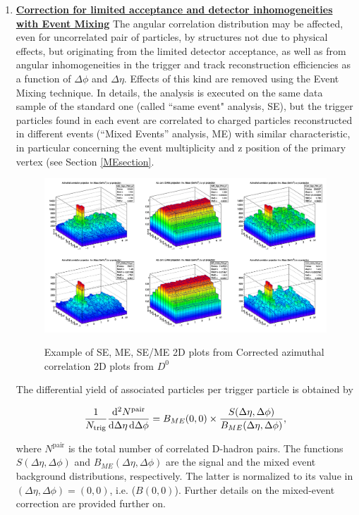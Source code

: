 \begin{enumerate}
\item
\underline {\bf Correction for limited acceptance and detector inhomogeneities with Event Mixing}
The angular correlation distribution may be affected, even for uncorrelated pair of particles, by structures not due to physical effects, but originating from the limited detector acceptance, as well as from angular inhomogeneities in the trigger and track reconstruction efficiencies as a function of $\Delta\phi$ and $\Delta\eta$.
Effects of this kind are removed using the Event Mixing technique.
In details, the analysis is executed on the same data sample of the standard one (called ``same event" analysis, SE), but the trigger particles found in each event are correlated to charged particles reconstructed in different events (``Mixed Events'' analysis, ME) with similar characteristic, in particular concerning the event multiplicity and z position of the primary vertex (see Section \ref{MEsection}. \\

\begin{figure}
\centering
{\includegraphics[width=.30\linewidth]{figures/Dzero/CorrSEandME_Dzero_Canvas_PtIntBins9to11_pool7_thr0.3to99.0.png}}

 \caption{Example of SE, ME, SE/ME 2D plots from Corrected azimuthal correlation 2D plots from ${D}^0$} 
\label{fig:DzeroME}
\end{figure}

The differential yield of associated particles per trigger particle is obtained by
\begin{linenomath}
  \begin{equation}
    \label{2pcorr_incl}
    \frac{1}{N_\text{trig}}\frac{\mathrm{d}^{2}N^\text{pair}}{\mathrm{d}\Delta\eta\, \mathrm{d}\Delta\phi}
= B_{ME}(0,0)\times\frac{S(\Delta\eta,\Delta\phi)}{B_{ME}(\Delta\eta,\Delta\phi)},
\end{equation}
\end{linenomath}
where $N^\text{pair}$ is the total number of correlated D-hadron
pairs. The functions $S(\Delta\eta,\Delta\phi)$ and
$B_{ME}(\Delta\eta,\Delta\phi)$ are the signal and the mixed event
background distributions, respectively. The latter is normalized to its value in
$(\Delta\eta,\Delta\phi)=(0,0)$, i.e. ($B(0,0)$).
Further details on the mixed-event correction are provided further on.


\end{enumerate}
